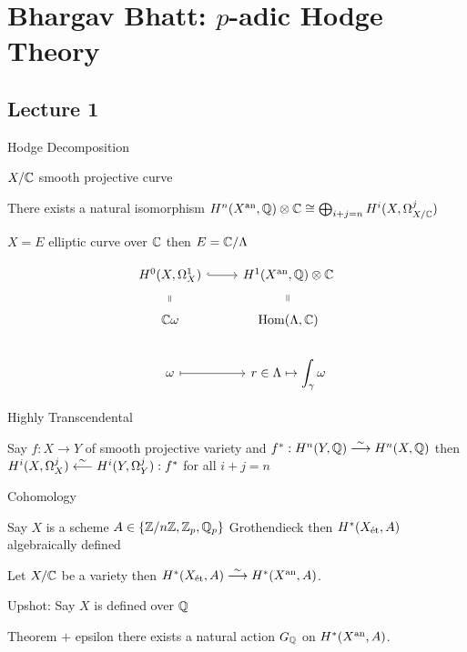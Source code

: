 \newpage
\section{Bhargav Bhatt: $p$-adic Hodge Theory}
\subsection{Lecture 1}

Hodge Decomposition

$X/\mathbb{C}$ smooth projective curve

\begin{thm}
There exists a natural isomorphism $H^n(X^{\text{an}}, \mathbb{Q}) \otimes \mathbb{C} \cong \bigoplus_{i+j=n} H^i(X, \Omega^j_{X/\mathbb{C}})$
\end{thm}

\begin{ex}
$X=E$ elliptic curve over $\mathbb{C}$ then $E= \mathbb{C}/\Lambda$
\end{ex}


\begin{thm}
	\[
	\begin{tikzcd}
	H^0(X,\Omega^1_X) \arrow[hook]{r} & H^1(X\an,\Q) \otimes \C \\
	\C \omega \arrow[draw=none]{u}[sloped,auto=false]{=} & \Hom(\Lambda, \C) \arrow[draw=none]{u}[sloped,auto=false]{=} \\
	\omega \arrow[mapsto]{r} & \ds r \in \Lambda \mapsto \int_\gamma \omega
	\end{tikzcd}
	\]
\end{thm}


Highly Transcendental 


\begin{cor}
Say $f: X \to Y$ of smooth projective variety and $f^*: H^n(Y, \mathbb{Q}) \stackrel{\sim}{\longrightarrow} H^n(X,\mathbb{Q})$ then $H^i(X,\Omega^j_X) \stackrel{\sim}{\longleftarrow} H^i(Y,\Omega_Y^j): f^*$ for all $i+j=n$
\end{cor}


\cetale Cohomology

Say $X$ is a scheme
$A \in \{ \mathbb{Z}/n\mathbb{Z}, \mathbb{Z}_p, \mathbb{Q}_p \}$
Grothendieck then $H^*(X_{\text{\'et}}, A)$ algebraically defined 

\begin{thm}[Artin]
Let $X/\mathbb{C}$ be a variety then $H^*(X_{\text{\'et}},A) \stackrel{\sim}{\longrightarrow} H^*(X^{\text{an}},A)$.
\end{thm}

Upshot: Say $X$ is defined over $\mathbb{Q}$

Theorem $+$ epsilon there exists a natural action $G_{\mathbb{Q}}$ on $H^*(X^{\text{an}},A)$.


